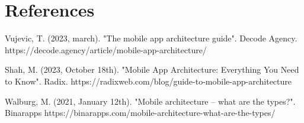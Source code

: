 \documentclass{article}
\begin{document}
	\section{References}
	Vujevic, T. (2023, march). "The mobile app architecture guide". Decode Agency. https://decode.agency/article/mobile-app-architecture/
	
	
	
	Shah, M. (2023, October 18th). "Mobile App Architecture: Everything You Need to Know". Radix.
	https://radixweb.com/blog/guide-to-mobile-app-architecture
	
	
	
	Walburg, M. (2021, January 12th). "Mobile architecture – what are the types?". Binarapps
	https://binarapps.com/mobile-architecture-what-are-the-types/
	
\end{document}
